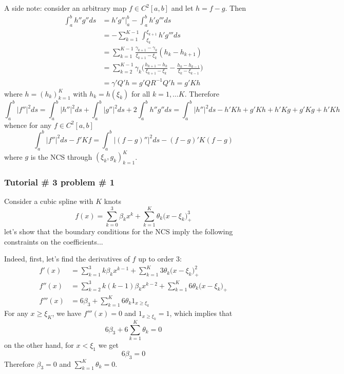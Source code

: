 \documentclass[a4paper]{article}
\begin{document}
A side note: consider an arbitrary map $f\in C^2[a,b]$ and let $h = f - g$. Then
\begin{align*}
	\int_a^b h'' g'' ds &= h' g''\rvert_a^b - \int_a^b h' g''' ds \\
	&= - \sum_{k=1}^{K-1} \int_{\xi_k}^{\xi_{k+1}} h' g''' ds \\
	&= \sum_{k=1}^{K-1} \frac{\gamma_{k+1}-\gamma_k}{\xi_{k+1}-\xi_k} (h_k - h_{k+1})\\
	&= \sum_{k=2}^{K-1} \gamma_k \bigl( \frac{h_{k+1}-h_k}{\xi_{k+1}-\xi_k}
		- \frac{h_k - h_{k-1}}{\xi_k-\xi_{k-1}}\bigr)\\
	&= \gamma'Q'h = g' Q R^{-1} Q' h = g' K h
\end{align*}
where $h = (h_k)_{k=1}^K$ with $h_k = h(\xi_k)$ for all $k=1,\ldots K$. Therefore
\[
\int_a^b |f''|^2 ds
= \int_a^b |h''|^2 ds + \int_a^b |g''|^2 ds + 2\int_a^b h''g'' ds
= \int_a^b |h''|^2 ds - h' K h + g' K h + h' K g + g' K g + h' K h
\]
whence for any $f\in C^2[a,b]$
\[ \int_a^b |f''|^2 ds - f' K f = \int_a^b |(f-g)''|^2 ds - (f-g)' K (f-g) \]
where $g$ is the NCS through $(\xi_k, g_k)_{k=1}^K$.


\subsubsection{Tutorial \# 3 problem \# 1} %
\label{ssub:tutorial_3_problem_1}

Consider a cubic spline with $K$ knots
\[f(x) = \sum_{k=0}^3 \beta_k x^k + \sum_{k=1}^K \theta_k \bigl(x-\xi_k\bigr)_+^3\]
let's show that the boundary conditions for the NCS imply the following constraints
on the coefficients...

Indeed, first, let's find the derivatives of $f$ up to order $3$:
\begin{align*}
	f'(x) &= \sum_{k=1}^3 k\beta_k x^{k-1} + \sum_{k=1}^K 3 \theta_k \bigl(x-\xi_k\bigr)_+^2\\
	f''(x) &= \sum_{k=2}^3 k(k-1)\beta_k x^{k-2} + \sum_{k=1}^K 6 \theta_k \bigl(x-\xi_k\bigr)_+\\
	f'''(x) &= 6 \beta_3 + \sum_{k=1}^K 6 \theta_k 1_{x\geq \xi_k}
\end{align*}
For any $x\geq \xi_K$, we have $f'''(x) = 0$ and $1_{x\geq \xi_k}=1$, which
implies that
\[6 \beta_3 + 6 \sum_{k=1}^K \theta_k = 0\]
on the other hand, for $x < \xi_1$ we get 
\[6 \beta_3 = 0\]
Therefore $\beta_3 = 0$ and $\sum_{k=1}^K \theta_k = 0$.
\end{document}
